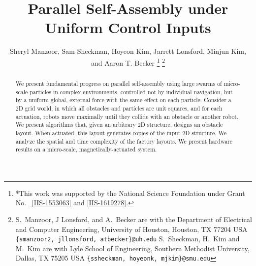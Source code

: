 \documentclass[letterpaper, 10 pt, conference]{ieeeconf}
\begin{document}
\title{\LARGE \bf 
Parallel Self-Assembly under Uniform Control Inputs 
}
\author{Sheryl Manzoor, Sam Sheckman, Hoyeon Kim, Jarrett Lonsford, Minjun Kim, and Aaron T. Becker%
\thanks{*This work was supported by the National Science Foundation under Grant No.\ \href{http://nsf.gov/awardsearch/showAward?AWD_ID=1553063}{ [IIS-1553063]} and \href{http://nsf.gov/awardsearch/showAward?AWD_ID=1619278}{[IIS-1619278]}.}%
\thanks{S.~Manzoor, J Lonsford, and  A.~Becker are with the Department of Electrical and Computer Engineering,  University of Houston, Houston, TX 77204 USA        {\tt\small  \{smanzoor2, jllonsford, atbecker\}@uh.edu}
S.~Sheckman, H.~Kim and M.~Kim are with Lyle School of Engineering,   Southern Methodist University, Dallas, TX 75205 USA        {\tt\small  \{ssheckman, hoyeonk, mjkim\}@smu.edu}
}
}
\maketitle


\begin{abstract} 
We present fundamental progress on parallel self-assembly using large swarms of micro-scale particles
in complex environments, controlled not by individual navigation, but by a uniform global, external force with the same effect on each particle.
Consider a 2D grid world, in which all obstacles and particles are unit squares,
and for each actuation, robots move maximally until they collide with an obstacle or another robot. 
We present algorithms that, given an arbitrary 2D structure, designs an obstacle layout.
 When actuated, this layout generates copies of the input 2D structure.
We analyze the spatial and time complexity of the factory layouts. 
We present hardware results on a micro-scale, magnetically-actuated system.


\end{abstract}












\end{document}
